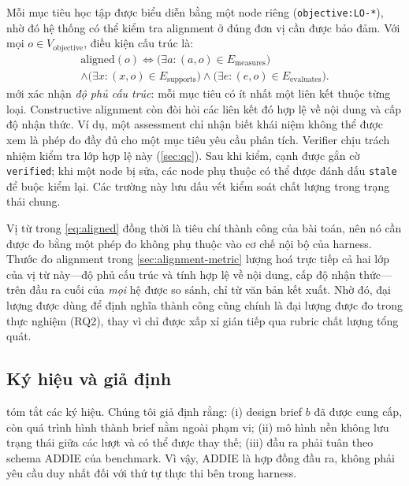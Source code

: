Mỗi mục tiêu học tập được biểu diễn bằng một node riêng
(\texttt{objective:LO-*}), nhờ đó hệ thống có thể kiểm tra alignment ở đúng đơn vị cần
được bảo đảm. Với mọi $o\in V_{\mathrm{objective}}$, điều kiện cấu trúc là:
\begin{multline}
\label{eq:aligned}
\mathrm{aligned}(o) \iff \big(\exists a\colon (a,o) \in E_{\mathrm{measures}}\big) \\
 \wedge \big(\exists x\colon (x,o) \in E_{\mathrm{supports}}\big) \wedge \big(\exists e\colon (e,o) \in E_{\mathrm{evaluates}}\big).
\end{multline}
 mới xác nhận \emph{độ phủ cấu trúc}: mỗi mục tiêu có ít nhất một
liên kết thuộc từng loại. Constructive alignment còn đòi hỏi các liên kết đó hợp lệ về
nội dung và cấp độ nhận thức. Ví dụ, một assessment chỉ nhận biết khái niệm không thể
được xem là phép đo đầy đủ cho một mục tiêu yêu cầu phân tích. Verifier chịu trách nhiệm
kiểm tra lớp hợp lệ này (\cref{sec:qc}). Sau khi kiểm, cạnh được gắn cờ
\texttt{verified}; khi một node bị sửa, các node phụ thuộc có thể được đánh dấu
\texttt{stale} để buộc kiểm lại. Các trường này lưu dấu vết kiểm soát chất lượng trong
trạng thái chung.

Vị từ trong \cref{eq:aligned} đồng thời là tiêu chí thành công của bài toán, nên nó
cần được đo bằng một phép đo không phụ thuộc vào cơ chế nội bộ của harness. Thước đo
alignment trong \cref{sec:alignment-metric} lượng hoá trực tiếp cả hai lớp của vị từ
này---độ phủ cấu trúc và tính hợp lệ về nội dung, cấp độ nhận thức---trên đầu ra cuối
của \emph{mọi} hệ được so sánh, chỉ từ văn bản kết xuất. Nhờ đó, đại lượng được dùng để
định nghĩa thành công cũng chính là đại lượng được đo trong thực nghiệm (RQ2), thay vì
chỉ được xấp xỉ gián tiếp qua rubric chất lượng tổng quát.

\subsection{Ký hiệu và giả định}
\label{sec:assumptions}

 tóm tắt các ký hiệu. Chúng tôi giả định rằng: (i) design brief $b$
đã được cung cấp, còn quá trình hình thành brief nằm ngoài phạm vi; (ii) mô hình nền
không lưu trạng thái giữa các lượt và có thể được thay thế; (iii) đầu ra phải tuân theo
schema ADDIE của benchmark. Vì vậy, ADDIE là hợp đồng đầu ra, không phải yêu cầu duy nhất
đối với thứ tự thực thi bên trong harness.

